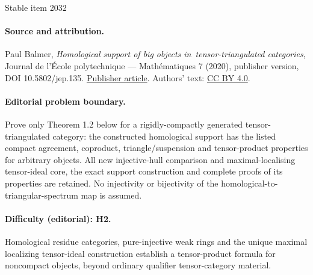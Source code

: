 \documentclass[11pt]{article}
\begin{document}
\begin{center}{\Large Stable item 2032}\end{center}
\paragraph{Source and attribution.}
Paul Balmer, \emph{Homological support of big objects in tensor-triangulated categories}, Journal de l’École polytechnique — Mathématiques 7 (2020), publisher version, DOI 10.5802/jep.135. \href{https://jep.centre-mersenne.org/articles/10.5802/jep.135/}{Publisher article}. Authors' text: \href{https://creativecommons.org/licenses/by/4.0/}{CC BY 4.0}.
\paragraph{Editorial problem boundary.}
Prove only Theorem 1.2 below for a rigidly-compactly generated tensor-triangulated category: the constructed homological support has the listed compact agreement, coproduct, triangle/suspension and tensor-product properties for arbitrary objects. All new injective-hull comparison and maximal-localising tensor-ideal core, the exact support construction and complete proofs of its properties are retained. No injectivity or bijectivity of the homological-to-triangular-spectrum map is assumed.
\paragraph{Difficulty (editorial): H2.}
Homological residue categories, pure-injective weak rings and the unique maximal localizing tensor-ideal construction establish a tensor-product formula for noncompact objects, beyond ordinary qualifier tensor-category material.
\end{document}
